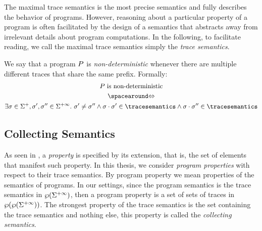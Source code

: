
The maximal trace semantics is the most precise semantics and fully describes the behavior of programs. However, reasoning about a particular property of a program is often facilitated by the design of a semantics that abstracts away from irrelevant details about program computations.
In the following, to facilitate reading, we call the maximal trace semantics simply the \emph{trace semantics}.

\begin{remark}
  We say that a program $P$ is \emph{non-deterministic} whenever there are multiple different traces that share the same prefix. Formally:
  \begin{gather*}
    \defprogram \text{ is non-deterministic} \\ \IfF \\ \exists \deftrace \in \finitesequences, \deftrace', \deftrace'' \in \finiteinfinitesequences.\spacer \deftrace' \neq \deftrace'' \land \concat{\deftrace}{\deftrace'} \in \tracesemantics \land \concat{\deftrace}{\deftrace''} \in \tracesemantics
  \end{gather*}
\end{remark}

\subsection{Collecting Semantics}

As seen in , a \emph{property} is specified by its extension, that is, the set of elements that manifest such property.
In this thesis, we consider \emph{program properties} with respect to their trace semantics.
By program property we mean properties of the semantics of programs.
In our settings, since the program semantics is the trace semantics in $\wp(\Sigma^{+\infty})$, then a program property is a set of sets of traces in $\wp(\wp(\Sigma^{+\infty}))$.
The strongest property of the trace semantics is the set containing the trace semantics and nothing else, this property is called the \emph{collecting semantics}.

